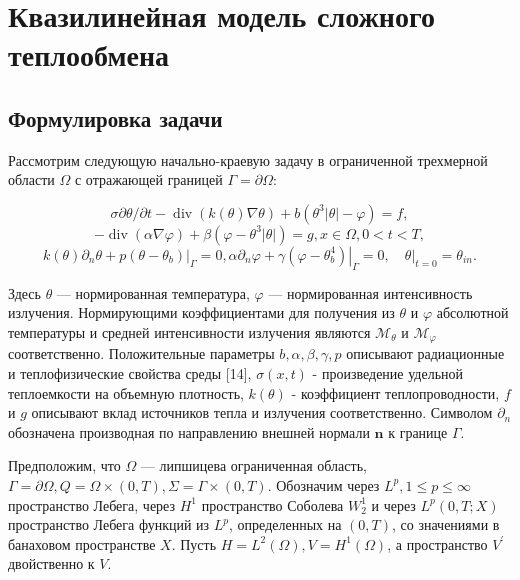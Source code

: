 \section{Квазилинейная модель сложного теплообмена}
\label{sec:ch1/sec5}

\subsection{Формулировка задачи}
\label{subsec:ch1/sec5/subsec1}

Рассмотрим следующую начально-краевую задачу в ограниченной трехмерной
области $\Omega$ с отражающей границей $\Gamma=\partial \Omega$:

\begin{equation}
    \label{eq:1_6:1}
    \sigma \partial \theta / \partial t
    -\operatorname{div}(k(\theta) \nabla \theta)
    +b\left(\theta^{3}|\theta|-\varphi\right)=f,
\end{equation}
\begin{equation}
    \label{eq:1_6:2}
    -\operatorname{div}(\alpha \nabla \varphi)
    +\beta\left(\varphi-\theta^{3}|\theta|\right)=g, x \in \Omega, 0<t<T,
\end{equation}
\begin{equation}
    \label{eq:1_6:3}
    k(\theta) \partial_{n} \theta+\left.p\left(\theta-\theta_{b}\right)\right|_{\Gamma}=0,
    \alpha \partial_{n} \varphi
    +\left.\gamma\left(\varphi-\theta_{b}^{4}\right)\right|_{\Gamma}=0,
    \left.\quad \theta\right|_{t=0}=\theta_{in}.
\end{equation}


Здесь $\theta$ — нормированная температура, $\varphi$ — нормированная интенсивность излучения.
Нормирующими коэффициентами для получения из $\theta$ и $\varphi$ абсолютной температуры
и средней интенсивности излучения являются $\mathcal{M}_{\theta}$ и $\mathcal{M}_{\varphi}$ соответственно.
Положительные параметры $b, \alpha, \beta, \gamma, p$ описывают радиационные
и теплофизические свойства среды [14], $\sigma(x, t)$ - произведение удельной
теплоемкости на объемную плотность, $k(\theta)$ - коэффициент теплопроводности,
$f$ и $g$ описывают вклад источников тепла и излучения соответственно.
Символом $\partial_{n}$ обозначена производная по направлению
внешней нормали $\mathbf{n}$ к границе $\Gamma$.

Предположим, что $\Omega$ — липшицева ограниченная область,
$\Gamma=\partial \Omega, Q=\Omega \times(0, T), \Sigma=\Gamma \times(0, T)$.
Обозначим через $L^{p}, 1 \leq p \leq \infty$ пространство Лебега,
через $H^{1}$ пространство Соболева $W_{2}^{1}$ и через $L^{p}(0, T ; X)$
пространство Лебега функций из $L^{p}$, определенных на $(0, T)$,
со значениями в банаховом пространстве $X$.
Пусть $H=L^{2}(\Omega), V=H^{1}(\Omega)$,
а пространство $V^{\prime}$ двойственно к $V$.

